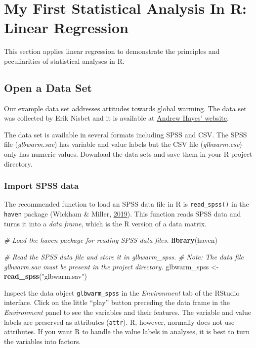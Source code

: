 \documentclass[doc,floatsintext]{apa6}
\newenvironment{Shaded}{\begin{snugshade}}{\end{snugshade}}
\newcommand{\KeywordTok}[1]{\textcolor[rgb]{0.13,0.29,0.53}{\textbf{#1}}}
\newcommand{\StringTok}[1]{\textcolor[rgb]{0.31,0.60,0.02}{#1}}
\newcommand{\CommentTok}[1]{\textcolor[rgb]{0.56,0.35,0.01}{\textit{#1}}}
\newcommand{\NormalTok}[1]{#1}
\begin{document}
\section{My First Statistical Analysis In R: Linear
Regression}\label{firstanalysis}

This section applies linear regression to demonstrate the principles and
peculiarities of statistical analyses in R.

\subsection{Open a Data Set}\label{open-a-data-set}

Our example data set addresses attitudes towards global warming. The
data set was collected by Erik Nisbet and it is available at
\href{http://afhayes.com/introduction-to-mediation-moderation-and-conditional-process-analysis.html}{Andrew
Hayes' website}.

The data set is available in several formats including SPSS and CSV. The
SPSS file (\emph{glbwarm.sav}) has variable and value labels but the CSV
file (\emph{glbwarm.csv}) only has numeric values. Download the data
sets and save them in your R project directory.

\subsubsection{Import SPSS data}\label{import-spss-data}

The recommended function to load an SPSS data file in R is
\texttt{read\_spss()} in the \texttt{haven} package (Wickham \& Miller,
\protect\hyperlink{ref-R-haven}{2019}). This function reads SPSS data
and turns it into a \emph{data frame}, which is the R version of a data
matrix.

\begin{Shaded}
\begin{Highlighting}[]
\CommentTok{# Load the haven package for reading SPSS data files.}
\KeywordTok{library}\NormalTok{(haven)}

\CommentTok{# Read the SPSS data file and store it in glbwarm_spss.}
\CommentTok{# Note: The data file glbwarm.sav must be present in the project directory.}
\NormalTok{glbwarm_spss <-}\StringTok{ }\KeywordTok{read_spss}\NormalTok{(}\StringTok{"glbwarm.sav"}\NormalTok{)}
\end{Highlighting}
\end{Shaded}

Inspect the data object \texttt{glbwarm\_spss} in the \emph{Environment}
tab of the RStudio interface. Click on the little \enquote{play} button
preceding the data frame in the \emph{Environment} panel to see the
variables and their features. The variable and value labels are
preserved as attributes (\texttt{attr}). R, however, normally does not
use attributes. If you want R to handle the value labels in analyses, it
is best to turn the variables into factors.
\end{document}
